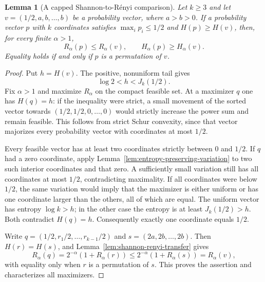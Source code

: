 \documentclass[11pt,a4paper,reqno]{amsart}
\newtheorem{lemma}[theorem]{Lemma}
\theoremstyle{remark}
\numberwithin{equation}{section}
\begin{document}
\begin{lemma}[A capped Shannon-to-R\'enyi comparison]\label{lem:capped-transfer}
Let $k\ge3$ and let $v=(1/2,a,b,\ldots,b)$ be a probability vector,
where $a>b>0$. If a probability vector $p$ with $k$ coordinates satisfies
$\max_i p_i\le1/2$ and $H(p)\ge H(v)$, then, for every finite
$\alpha>1$,
\[
 R_\alpha(p)\le R_\alpha(v),\qquad
 H_\alpha(p)\ge H_\alpha(v).
\]
Equality holds if and only if $p$ is a permutation of $v$.
\end{lemma}
\begin{proof}
Put $h=H(v)$. The positive, nonuniform tail gives
\[
 \log2<h<J_k(1/2).
\]
Fix $\alpha>1$ and maximize $R_\alpha$ on the compact feasible set.
At a maximizer $q$ one has $H(q)=h$: if the inequality were strict,
a small movement of the sorted vector towards $(1/2,1/2,0,\ldots,0)$
would strictly increase the power sum and remain feasible. This
follows from strict Schur convexity, since that vector majorizes
every probability vector with coordinates at most $1/2$.

Every feasible vector has at least two coordinates strictly between
$0$ and $1/2$. If $q$ had a zero coordinate, apply
Lemma~\ref{lem:entropy-preserving-variation} to two such interior
coordinates and that zero. A sufficiently small variation still
has all coordinates at most $1/2$, contradicting maximality.
If all coordinates were below $1/2$, the same variation would imply
that the maximizer is either uniform or has one coordinate larger
than the others, all of which are equal.
The uniform vector has entropy $\log k>h$; in the other case the
entropy is at least $J_k(1/2)>h$. Both contradict $H(q)=h$.
Consequently exactly one coordinate equals $1/2$.

Write $q=(1/2,r_1/2,\ldots,r_{k-1}/2)$ and
$s=(2a,2b,\ldots,2b)$. Then $H(r)=H(s)$, and
Lemma~\ref{lem:shannon-renyi-transfer} gives
\[
 R_\alpha(q)=2^{-\alpha}(1+R_\alpha(r))
 \le2^{-\alpha}(1+R_\alpha(s))=R_\alpha(v),
\]
with equality only when $r$ is a permutation of $s$.
This proves the assertion and characterizes all maximizers.
\end{proof}
\end{document}
